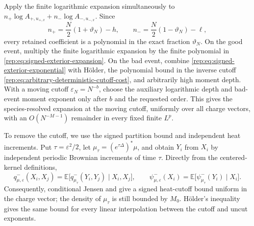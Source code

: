 \documentclass[11pt,reqno]{amsart}
\numberwithin{equation}{section}
\theoremstyle{plain}
\theoremstyle{definition}
\newcommand{\E}{\mathbb E}
\newcommand{\vep}{\varepsilon}
\begin{document}
Apply the finite logarithmic expansion simultaneously to
$n_+\log A_{+,u_{+,x}}+n_-\log A_{-,u_{-,x}}$.  Since
\begin{equation}
 n_+=\frac N2(1+\vartheta_N)-h,
 \qquad
 n_-=\frac N2(1-\vartheta_N)-\ell,
\end{equation}
every retained coefficient is a polynomial in the exact fraction
$\vartheta_N$.  On the good event, multiply the finite logarithmic expansion
by the finite polynomial in \eqref{rep:eq:signed-exterior-expansion}.  On the bad
event, combine \eqref{rep:eq:signed-exterior-exponential} with H\"older, the
polynomial bound in the inverse cutoff \eqref{rep:eq:arbitrary-deterministic-cutoff-cost}, and
arbitrarily high moment depth.  With a moving cutoff
$\vep_N=N^{-b}$, choose the auxiliary logarithmic depth and bad-event
moment exponent only after $b$ and the requested order.  This gives the
species-resolved expansion at the moving cutoff, uniformly over all charge
vectors, with an $O(N^{-M-1})$ remainder in every fixed finite $L^p$.

To remove the cutoff, we use the signed partition bound and independent heat increments.  Put $\tau=\vep^2/2$, let $\mu_\tau=(e^{\tau\Delta})^*\mu$, and obtain $Y_i$ from $X_i$ by independent periodic Brownian increments of time $\tau$.  Directly from the centered-kernel definitions,
\begin{equation}
 q^-_{\mu,\vep}(X_i,X_j)
 =\E\bigl[q^-_{\mu_\tau}(Y_i,Y_j)\mid X_i,X_j\bigr],
 \qquad
 \psi^-_{\mu,\vep}(X_i)
 =\E\bigl[\psi^-_{\mu_\tau}(Y_i)\mid X_i\bigr].
\end{equation}
Consequently, conditional Jensen and  give a signed heat-cutoff bound uniform in the charge vector; the density of $\mu_\tau$ is still bounded by $M_0$.  H\"older's inequality gives the same bound for every linear interpolation between the cutoff and uncut exponents.
\end{document}
